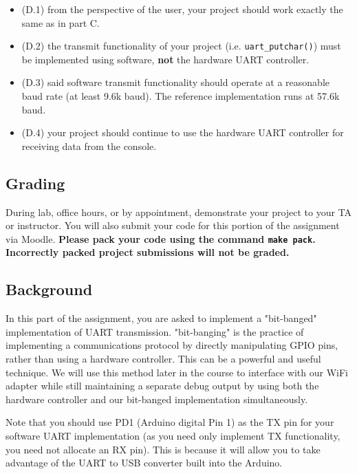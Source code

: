 \documentclass{article}
\begin{document}
\begin{itemize}

	\item (D.1) from the perspective of the user, your project should work
		exactly the same as in part C.

	\item (D.2) the transmit functionality of your project (i.e.
		\texttt{uart\_putchar()}) must be implemented using software,
		\textbf{not} the hardware UART controller.

	\item (D.3) said software transmit functionality should operate at a
		reasonable baud rate (at least 9.6k baud). The reference
		implementation runs at 57.6k baud.

	\item (D.4) your project should continue to use the hardware UART
		controller for receiving data from the console.

\end{itemize}

\subsection{Grading}

During lab, office hours, or by appointment, demonstrate your project to your
TA or instructor.  You will also submit your code for this portion of the
assignment via Moodle.  \textbf{Please pack your code using the command
\texttt{make pack}.  Incorrectly packed project submissions will not be
graded.}

\subsection{Background}

In this part of the assignment, you are asked to implement a "bit-banged"
implementation of UART transmission. "bit-banging" is the practice of
implementing a communications protocol by directly manipulating GPIO pins,
rather than using a hardware controller. This can be a powerful and useful
technique. We will use this method later in the course to interface with our
WiFi adapter while still maintaining a separate debug output by using both the
hardware controller and our bit-banged implementation simultaneously.

Note that you should use PD1 (Arduino digital Pin 1) as the TX pin for your
software UART implementation (as you need only implement TX functionality, you
need not allocate an RX pin). This is because it will allow you to take
advantage of the UART to USB converter built into the Arduino.
\end{document}
